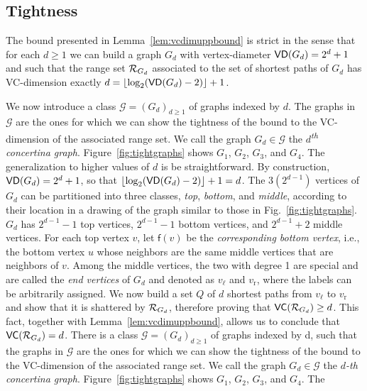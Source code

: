 \subsection{Tightness}\label{sec:tightness}
The bound presented in Lemma~\ref{lem:vcdimuppbound} is strict in the sense that
for each $d\ge 1$ we can build a graph $G_d$ with vertex-diameter
$\mathsf{VD}(G_d)=2^d+1$ and such that the range set $\mathcal{R}_{G_d}$ associated to the set of
shortest paths of $G_d$ has VC-dimension exactly
$d=\lfloor\log_2(\mathsf{VD}(G_d)-2)\rfloor+1$. 

\ifproof
We now introduce a class $\mathcal{G}=(G_d)_{d\ge 1}$ of graphs indexed by $d$.
The graphs in $\mathcal{G}$ are the ones for which we can show the tightness of
the bound to the VC-dimension of the associated range set.
We call the graph $G_d\in\mathcal{G}$ the \emph{$d$\textsuperscript{th} concertina graph}.
Figure~\ref{fig:tightgraphs} shows $G_1$, $G_2$, $G_3$, and $G_4$. The
generalization to higher values of $d$ is be straightforward.
By construction, $\mathsf{VD}(G_d)=2^d+1$, so that
$\lfloor\log_2(\mathsf{VD}(G_d)-2)\rfloor+1=d$. The $3(2^{d-1})$ vertices of $G_d$ can
be partitioned into three classes, \emph{top}, \emph{bottom}, and \emph{middle},
according to their location in a drawing of the graph similar to those in
Fig.~\ref{fig:tightgraphs}. $G_d$ has $2^{d-1}-1$ top vertices, $2^{d-1}-1$ bottom vertices, and
$2^{d-1}+2$ middle vertices. For each top vertex $v$, let $\mathsf{f}(v)$ be the
\emph{corresponding bottom vertex}, i.e., the bottom vertex $u$ whose neighbors
are the same middle vertices that are neighbors of $v$. Among the middle
vertices, the two with degree 1 are special and are called the \emph{end
vertices} of $G_d$ and denoted as $v_\ell$ and $v_\mathrm{r}$, where the
labels can be arbitrarily assigned. We now build a set $Q$ of $d$
shortest paths from $v_\ell$ to $v_\mathrm{r}$ and show that it is
shattered by $\mathcal{R}_{G_d}$, therefore proving that $\mathsf{VC}(\mathcal{R}_{G_d})\ge d$.
This fact, together with Lemma~\ref{lem:vcdimuppbound}, allows us to conclude
that $\mathsf{VC}(\mathcal{R}_{G_d})=d$. 
\else
There is a class $\mathcal{G}=(G_d)_{d\ge 1}$ of graphs indexed by d, such that
the graphs in $\mathcal{G}$ are the ones for which we can show the tightness of
the bound to the VC-dimension of the associated range set. We call the graph
$G_d\in\mathcal{G}$ the \emph{$d$-th concertina graph}.
Figure~\ref{fig:tightgraphs} shows $G_1$, $G_2$, $G_3$, and $G_4$. The
